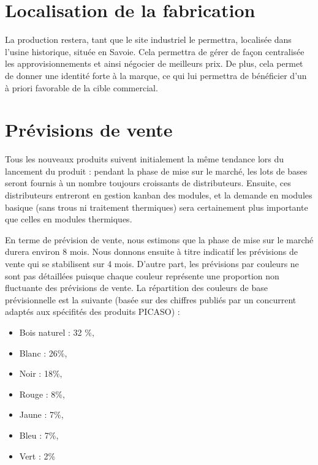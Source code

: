 \section{Localisation de la fabrication}
La production restera, tant que le site industriel le permettra,
localisée dans l'usine historique, située en Savoie. Cela permettra de
gérer de façon centralisée les approvisionnements et ainsi négocier de
meilleurs prix. De plus, cela permet de donner une identité forte à la
marque, ce qui lui permettra de bénéficier d'un à priori favorable de la
cible commercial.

\section{Prévisions de vente}
Tous les nouveaux produits suivent initialement la même tendance lors du
lancement du produit : pendant la phase de mise sur le marché, les lots
de bases seront fournis à un nombre toujours croissants de
distributeurs. Ensuite, ces distributeurs entreront en gestion kanban
des modules, et la demande en modules basique (sans trous ni traitement
thermiques) sera certainement plus importante que celles en modules
thermiques.

En terme de prévision de vente, nous estimons que la phase de mise sur le
marché durera environ 8 mois. Nous donnons ensuite à titre indicatif les
prévisions de vente qui se stabilisent sur 4 mois. D'autre part, les
prévisions par couleurs ne sont pas détaillées puisque chaque couleur
représente une proportion non fluctuante des prévisions de vente. La
répartition des couleurs de base prévisionnelle est la suivante (basée
sur des chiffres publiés par un concurrent adaptés aux spécifités des
produits PICASO) :

\begin{itemize}
\item Bois naturel : 32 \%,
\item Blanc : 26\%,
\item Noir : 18\%,
\item Rouge : 8\%,
\item Jaune : 7\%,
\item Bleu : 7\%,
\item Vert : 2\%
\end{itemize}

